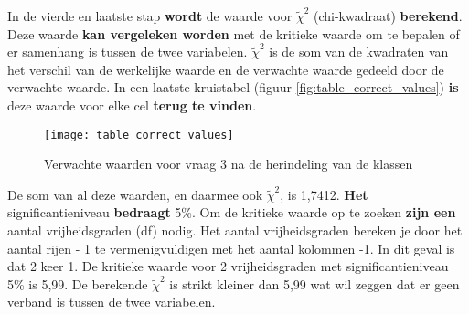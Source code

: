 In de vierde en laatste stap \textbf{wordt} de waarde voor $\tilde\chi^2$ (chi-kwadraat) \textbf{berekend}. Deze waarde \textbf{kan vergeleken worden} met de kritieke waarde om te bepalen of er samenhang is tussen de twee variabelen. $\tilde\chi^2$ is de som van de kwadraten van het verschil van de werkelijke waarde en de verwachte waarde gedeeld door de verwachte waarde. In een laatste kruistabel (figuur \ref{fig:table_correct_values}) \textbf{is} deze waarde voor elke cel \textbf{terug te vinden}.

\begin{figure}
	\centering
	\texttt{[image: table\_correct\_values]}
	\caption{Verwachte waarden voor vraag 3 na de herindeling van de klassen}
	\label{fig:tablecorrectvalues}
\end{figure}

De som van al deze waarden, en daarmee ook $\tilde\chi^2$, is 1,7412. \textbf{Het} significantieniveau \textbf{bedraagt} 5\%. Om de kritieke waarde op te zoeken \textbf{zijn een} aantal vrijheidsgraden (df) nodig. Het aantal vrijheidsgraden bereken je door het aantal rijen - 1 te vermenigvuldigen met het aantal kolommen  -1. In dit geval is dat 2 keer 1. De kritieke waarde voor 2 vrijheidsgraden met significantieniveau 5\% is 5,99. De berekende $\tilde\chi^2$ is strikt kleiner dan 5,99 wat wil zeggen dat er geen verband is tussen de twee variabelen.

